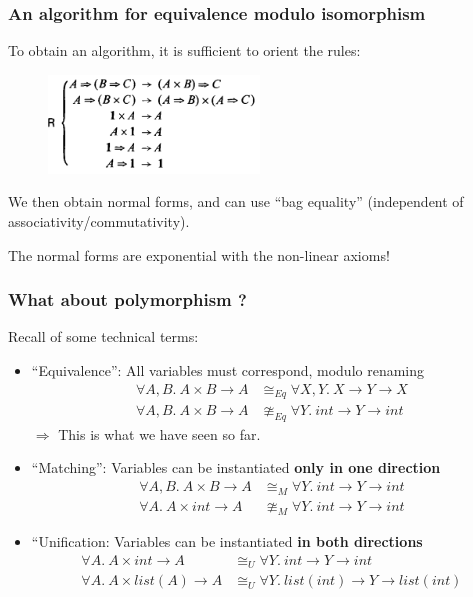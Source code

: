 \documentclass[aspectratio=169,dvipsnames,svgnames,10pt]{beamer}
\begin{document}
\begin{frame}
  \frametitle{An algorithm for equivalence modulo isomorphism}

  To obtain an algorithm, it is sufficient to orient the rules:
  
  \begin{figure}
    \centering
    \includegraphics[width=0.5\textwidth]{orientedrules}
  \end{figure}

  We then obtain normal forms, and can use ``bag equality'' (independent of associativity/commutativity).

  The normal forms are exponential with the non-linear axioms!
  
\end{frame}

\begin{frame}
  \frametitle{What about polymorphism ?}

  Recall of some technical terms:
  \begin{itemize}
  \item ``Equivalence'': All variables must correspond, modulo renaming
    \begin{align*}
      \forall A, B.\ A \times B \to A &\cong_{Eq} \forall X, Y.\ X \to Y \to X\\
      \forall A, B.\ A \times B \to A &\ncong_{Eq} \forall Y.\ int \to Y \to int
    \end{align*}
    $\Rightarrow$ This is what we have seen so far.
    
  \item<2-> ``Matching'': Variables can be instantiated {\bf only in one direction}
    \begin{align*}
      \forall A, B.\ A \times B \to A &\cong_{M} \forall Y.\ int \to Y \to int\\
      \forall A.\ A \times int \to A &\ncong_{M} \forall Y.\ int \to Y \to int
    \end{align*}
  \item<3-> ``Unification: Variables can be instantiated {\bf in both directions}
    \begin{align*}
      \forall A.\ A \times int \to A &\cong_{U} \forall Y.\ int \to Y \to int\\
      \forall A.\ A \times list(A) \to A &\cong_{U} \forall Y.\ list(int) \to Y \to list(int)\\
    \end{align*}
  \end{itemize}
\end{frame}
\end{document}
